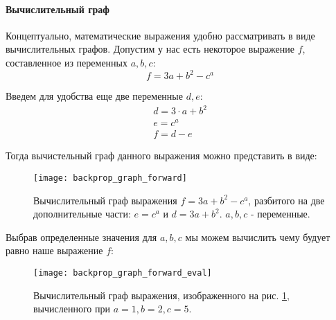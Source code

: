 \paragraph{Вычислительный граф}

Концептуально, математические выражения удобно рассматривать в виде 
вычислительных графов. Допустим у нас есть некоторое выражение $f$, 
составленное из переменных $a, b, c$:
\begin{equation*}
    f = 3a + b^2 - c^a
\end{equation*}

Введем для удобства еще две переменные $d, e$:
\begin{gather*}
    d = 3 \cdot a + b^2 \\
    e = c^a \\
    f = d - e
\end{gather*}

Тогда вычистельный граф данного выражения можно представить в виде:
\begin{figure}[h!]
    \centering
    \texttt{[image: backprop\_graph\_forward]}
    \caption{Вычислительный граф выражения $f = 3a + b^2 - c^a$, разбитого на две 
    дополнительные части: $e = c^a$ и $d = 3a + b^2$. $a, b, c$ - переменные.}
    \label{fig:backprop_graph_forward}
\end{figure}





\newpage
Выбрав определенные значения для $a, b, c$ мы можем вычислить чему будует равно 
наше выражение $f$:
\begin{figure}[h!]
    \centering
    \texttt{[image: backprop\_graph\_forward\_eval]}
    \caption{Вычислительный граф выражения, изображенного на рис. 
    \ref{fig:backprop_graph_forward}, вычисленного при $a=1, b=2, c=5$.}
    \label{fig:backprop_graph_forward_eval}
\end{figure}

